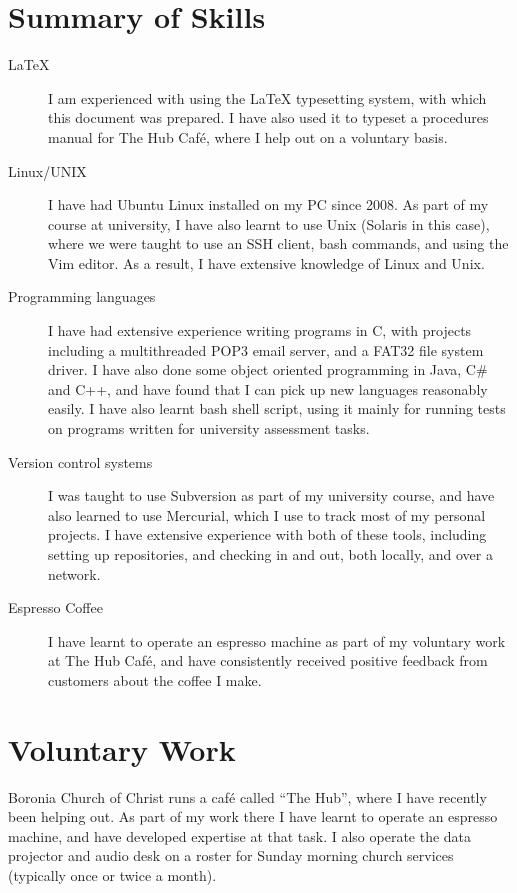 \documentclass[a4paper]{article}
\begin{document}
\section{Summary of Skills}
\begin{description}
    \item[\LaTeX{}] I am experienced with using the \LaTeX{} typesetting
        system, with which this document was prepared. I have also used
        it to typeset a procedures manual for The Hub Caf\'e, where I
        help out on a voluntary basis.
    \item[Linux/UNIX] I have had Ubuntu Linux installed on my PC since
        2008. As part of my course at university, I have also learnt to
        use Unix (Solaris in this case), where we were taught to use an
        SSH client, bash commands, and using the Vim editor. As a result,
        I have extensive knowledge of Linux and Unix.
    \item[Programming languages] I have had extensive experience writing
        programs in C, with projects including a multithreaded POP3 email 
        server, and a FAT32 file system driver. I have also done some
        object oriented programming in Java, C\# and C++, and have found that
        I can pick up new languages reasonably easily. I have also learnt
        bash shell script, using it mainly for running tests on programs
        written for university assessment tasks.
    \item[Version control systems] I was taught to use Subversion as part
        of my university course, and have also learned to use Mercurial,
        which I use to track most of my personal projects. I have extensive
        experience with both of these tools, including setting up
        repositories, and checking in and out, both locally, and over a
        network.
    \item[Espresso Coffee] I have learnt to operate an espresso machine as
        part of my voluntary work at The Hub Caf\'e, and have consistently
        received positive feedback from customers about the coffee I make.
\end{description}

\section{Voluntary Work}
Boronia Church of Christ runs a caf\'e called ``The Hub'', where I have
recently been helping out. As part of my work there I have learnt to
operate an espresso machine, and have developed expertise at that task. I 
also operate the data projector and audio desk on a roster for Sunday 
morning church services (typically once or twice a month).
\end{document}
